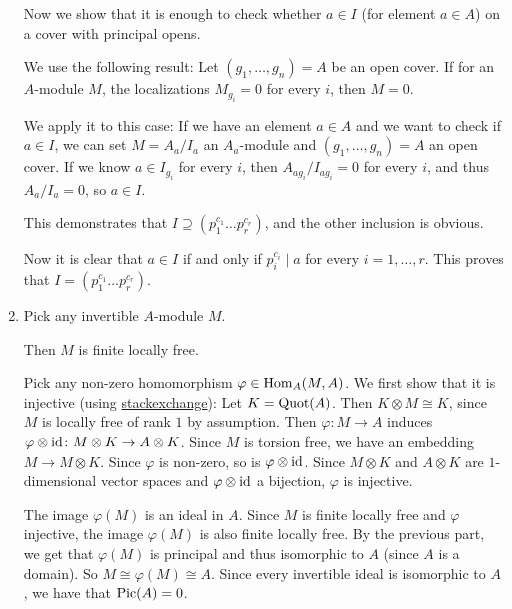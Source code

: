 \begin{exercise}{1}
\begin{enumerate}
{                Now we show that it is enough to check whether $a \in I$ (for
                element $a \in A$) on a cover with principal opens.

                We use the following result:
                Let $(g_1, \dots, g_n) = A$ be an open cover.
                If for an $A$-module $M$, the localizations $M_{g_i} = 0$ for every
                $i$, then $M = 0$.

                We apply it to this case:
                If we have an element $a \in A$ and we want to check if $a
                \in I$, we can set $M = A_a/I_a$ an $A_a$-module and $(g_1,
                \dots, g_n) = A$ an open cover. If we know $a \in I_{g_i}$ for
                every $i$, then $A_{a g_i} / I_{a g_i} = 0$ for every $i$, and
                thus $A_a/I_a = 0$, so $a \in I$.

                This demonstrates that $I \supseteq (p^{c_1}_1 \dots
                p^{c_r}_r)$, and the other inclusion is obvious.

                Now it is clear that $a \in I$ if and only if $p^{c_i}_i \mid a$
                for every $i = 1, \dots, r$. This proves that $I = (p^{c_1}_1
                \dots p^{c_r}_r)$.
            }
        \item{
                Pick any invertible $A$-module $M$.

                Then $M$ is finite locally free. 

                Pick any non-zero homomorphism $\varphi \in \operatorname{Hom}_A(M, A)$.
                We first show that it is injective (using
                \href{https://math.stackexchange.com/questions/4325769/picard-group-of-ufd-is-trivial}{stackexchange}):
                Let $K = \operatorname{Quot}(A)$. Then $K \otimes M \cong K$, since $M$ is
                locally free of rank $1$ by assumption. Then $\varphi \colon M
                \to A$ induces $\varphi \otimes \operatorname{id} \colon M \otimes K \to A
                \otimes K$. Since $M$ is torsion free, we have an embedding $M
                \to M \otimes K$. Since $\varphi$ is non-zero, so is $\varphi
                \otimes \operatorname{id}$. Since $M \otimes K$ and $A \otimes K$ are
                $1$-dimensional vector spaces and $\varphi \otimes \operatorname{id}$ a
                bijection, $\varphi$ is injective.

                The image $\varphi(M)$ is an ideal in $A$.
                Since $M$ is finite locally free and $\varphi$ injective, the
                image $\varphi(M)$ is also finite locally free. By the previous
                part, we get that $\varphi(M)$ is principal and thus isomorphic to $A$
                (since $A$ is a domain).
                So $M \cong \varphi(M) \cong A$.
                Since every invertible ideal is isomorphic to $A$, we have that
                $\operatorname{Pic}(A) = 0$.
            }
    \end{enumerate}
\end{exercise}

